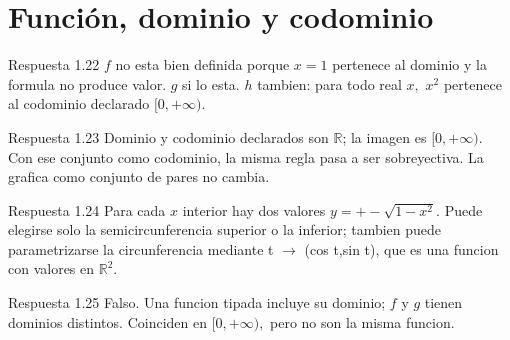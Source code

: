 \documentclass[10pt,a4paper,oneside,openany]{book}
\begin{document}
\section{Función, dominio y codominio}
\begin{PSevenAnswerFixed}{Respuesta 1.22}
\(f\) no esta bien definida porque \(x=1\) pertenece al dominio y la formula no produce valor. \(g\) si lo esta. \(h\) tambien: para todo real \(x,\) \(x^{2}\) pertenece al codominio declarado \([0,+\infty )\).
\end{PSevenAnswerFixed}
\begin{PSevenAnswerFixed}{Respuesta 1.23}
Dominio y codominio declarados son \(\mathbb{R}\); la imagen es \([0,+\infty )\). Con ese conjunto como codominio, la misma regla pasa a ser sobreyectiva. La grafica como conjunto de pares no cambia.
\end{PSevenAnswerFixed}
\begin{PSevenAnswerFixed}{Respuesta 1.24}
Para cada \(x\) interior hay dos valores \(y=+-\sqrt{1-x^{2}}\). Puede elegirse solo la semicircunferencia superior o la inferior; tambien puede parametrizarse la circunferencia mediante t \(\to \) (cos t,sin t), que es una funcion con valores en \(\mathbb{R}^{2}\).
\end{PSevenAnswerFixed}
\begin{PSevenAnswerFixed}{Respuesta 1.25}
Falso. Una funcion tipada incluye su dominio; \(f\) y \(g\) tienen dominios distintos. Coinciden en \([0,+\infty ),\) pero no son la misma funcion.
\end{PSevenAnswerFixed}
\end{document}
